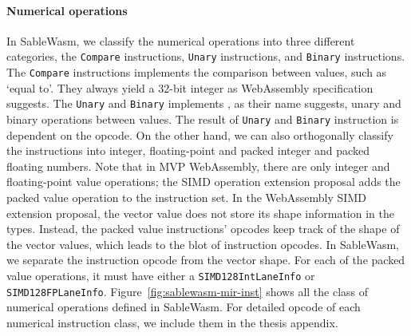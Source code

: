\paragraph{Numerical operations}
In SableWasm, we classify the numerical operations into three different categories, the \texttt{Compare} instructions, \texttt{Unary} instructions, and \texttt{Binary} instructions. The \texttt{Compare} instructions implements the comparison between values, such as `equal to'. They always yield a 32-bit integer as WebAssembly specification suggests. The \texttt{Unary} and \texttt{Binary} implements , as their name suggests, unary and binary operations between values. The result of \texttt{Unary} and \texttt{Binary} instruction is dependent on the opcode. On the other hand, we can also orthogonally classify the instructions into integer, floating-point and packed integer and packed floating numbers. Note that in MVP WebAssembly, there are only integer and floating-point value operations; the SIMD operation extension proposal adds the packed value operation to the instruction set. In the WebAssembly SIMD extension proposal, the vector value does not store its shape information in the types. Instead, the packed value instructions' opcodes keep track of the shape of the vector values, which leads to the blot of instruction opcodes. In SableWasm, we separate the instruction opcode from the vector shape. For each of the packed value operations, it must have either a \texttt{SIMD128IntLaneInfo} or \texttt{SIMD128FPLaneInfo}. Figure~\ref{fig:sablewasm-mir-inst} shows all the class of numerical operations defined in SableWasm. For detailed opcode of each numerical instruction class, we include them in the thesis appendix.


